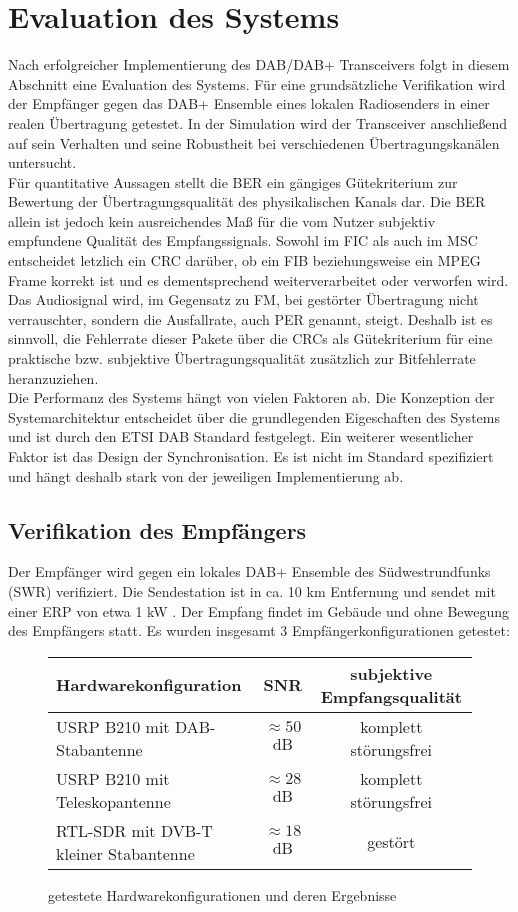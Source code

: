 \chapter{Evaluation des Systems}
\label{sec:evaluation}
Nach erfolgreicher Implementierung des DAB/DAB+ Transceivers folgt in diesem Abschnitt eine Evaluation des Systems. Für eine grundsätzliche Verifikation wird der Empfänger gegen das DAB+ Ensemble eines lokalen Radiosenders in einer realen Übertragung getestet. In der Simulation wird der Transceiver anschließend auf sein Verhalten und seine Robustheit bei verschiedenen Übertragungskanälen untersucht. \\
Für quantitative Aussagen stellt die \ac{BER} ein gängiges Gütekriterium zur Bewertung der Übertragungsqualität des physikalischen Kanals dar. Die \ac{BER} allein ist jedoch kein ausreichendes Maß für die vom Nutzer subjektiv empfundene Qualität des Empfangssignals. Sowohl im FIC als auch im MSC entscheidet letzlich ein CRC darüber, ob ein FIB beziehungsweise ein MPEG Frame korrekt ist und es dementsprechend weiterverarbeitet oder verworfen wird. Das Audiosignal wird, im Gegensatz zu FM, bei gestörter Übertragung nicht verrauschter, sondern die Ausfallrate, auch \ac{PER} genannt, steigt. Deshalb ist es sinnvoll, die Fehlerrate dieser Pakete über die CRCs als Gütekriterium für eine praktische bzw. subjektive Übertragungsqualität zusätzlich zur Bitfehlerrate heranzuziehen.\\

Die Performanz des Systems hängt von vielen Faktoren ab. Die Konzeption der Systemarchitektur entscheidet über die grundlegenden Eigeschaften des Systems und ist durch den ETSI DAB Standard \cite{etsi:dab_main} festgelegt. Ein weiterer wesentlicher Faktor ist das Design der Synchronisation. Es ist nicht im Standard spezifiziert und hängt deshalb stark von der jeweiligen Implementierung ab.

\section{Verifikation des Empfängers}
Der Empfänger wird gegen ein lokales DAB+ Ensemble des Südwestrundfunks (SWR) verifiziert. Die Sendestation ist in ca. 10 km Entfernung und sendet mit einer \ac{ERP} von etwa 1 kW \cite{web:wattkopf_sender}. Der Empfang findet im Gebäude und ohne Bewegung des Empfängers statt. Es wurden insgesamt 3 Empfängerkonfigurationen getestet:

\begin{figure} [h]
\begin{tabular}{l | c | c}
Hardwarekonfiguration & SNR & subjektive Empfangsqualität \\
\hline
USRP B210 mit DAB-Stabantenne & $\approx 50$ dB & komplett störungsfrei \\
USRP B210 mit Teleskopantenne & $\approx 28$ dB & komplett störungsfrei \\
RTL-SDR mit DVB-T kleiner Stabantenne & $\approx 18$ dB & gestört
\end{tabular}
\caption{getestete Hardwarekonfigurationen und deren Ergebnisse}
\label{tab:hardware}
\end{figure}

